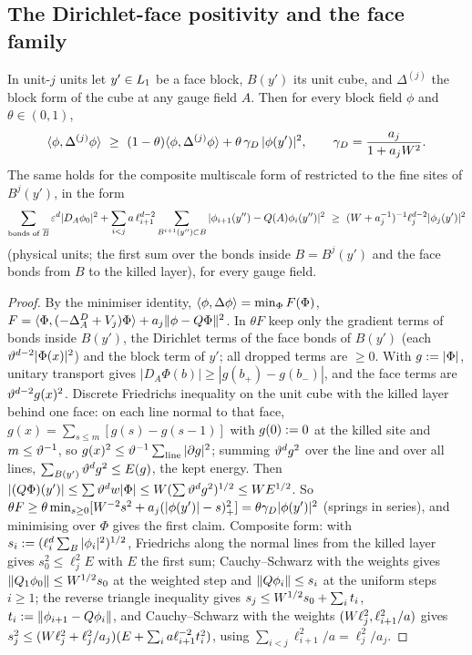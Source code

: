 \subsection{The Dirichlet-face positivity and the face family}\label{app:a01:face}

\begin{lemma}\label{lem:a01:FPC}
In unit-$j$ units let $y'\in L_{1}$ be a face block, $B(y')$ its unit cube, and $\Delta^{(j)}$ the block form of the cube at any gauge field $A$. Then for every block field $\phi$ and $\theta\in(0,1)$,
\[
\ip\phi{\Delta^{(j)}\phi}\ \ge\ (1-\theta)\ip\phi{\Delta^{(j)}\phi}+\theta\,\gamma_D\,|\phi(y')|^2,\qquad\gamma_D=\frac{a_j}{1+a_j\Wt^2}.
\]
The same holds for the composite multiscale form of \cite[(3.23)--(3.25)]{Ba2} restricted to the fine sites of $B^j(y')$, in the form
\[
\sum_{\text{bonds of }\overline{B}}\eps^{d}|D_A\phi_0|^2+\sum_{i<j}a\,\ell_{i+1}^{d-2}\sum_{B^{i+1}(y'')\subset B}|\phi_{i+1}(y'')-Q(A)\phi_i(y'')|^2\ \ge\ (\Wt+a_j^{-1})^{-1}\ell_j^{d-2}|\phi_j(y')|^2
\]
(physical units; the first sum over the bonds inside $B=B^j(y')$ and the face bonds from $B$ to the killed layer), for every gauge field.
\end{lemma}
\begin{proof}
By the minimiser identity, $\langle \phi,\Delta\phi\rangle=\min_\Phi F(\Phi)$, $F=\langle \Phi,(-\Delta^D_A+V_j)\Phi\rangle+a_j\lVert \phi-Q\Phi\rVert^2$. In $\theta F$ keep only the gradient terms of bonds inside $B(y')$, the Dirichlet terms of the face bonds of $B(y')$ (each $\vartheta^{d-2}|\Phi(x)|^2$) and the block term of $y'$; all dropped terms are $\ge0$. With $g:=|\Phi|$, unitary transport gives $|D_A\Phi(b)|\ge|g(b_+)-g(b_-)|$, and the face terms are $\vartheta^{d-2}g(x)^2$. Discrete Friedrichs inequality on the unit cube with the killed layer behind one face: on each line normal to that face, $g(x)=\sum_{s\le m}[g(s)-g(s-1)]$ with $g(0):=0$ at the killed site and $m\le\vartheta^{-1}$, so $g(x)^2\le\vartheta^{-1}\sum_{\text{line}}|\partial g|^2$; summing $\vartheta^dg^2$ over the line and over all lines, $\sum_{B(y')}\vartheta^dg^2\le E(g)$, the kept energy. Then $|(Q\Phi)(y')|\le\sum\vartheta^dw|\Phi|\le W(\sum\vartheta^dg^2)^{1/2}\le W E^{1/2}$. So $\theta F\ge\theta\min_{s\ge0}[W^{-2}s^2+a_j(|\phi(y')|-s)_+^2]=\theta\gamma_D|\phi(y')|^2$ (springs in series), and minimising over $\Phi$ gives the first claim. Composite form: with $s_i:=(\ell_i^d\sum_B|\phi_i|^2)^{1/2}$, Friedrichs along the normal lines from the killed layer gives $s_0^2\le\ell_j^2E$ with $E$ the first sum; Cauchy--Schwarz with the weights gives $\lVert Q_1\phi_0\rVert\le W^{1/2}s_0$ at the weighted step and $\lVert Q\phi_i\rVert\le s_i$ at the uniform steps $i\ge1$; the reverse triangle inequality gives $s_j\le W^{1/2}s_0+\sum_it_i$, $t_i:=\lVert \phi_{i+1}-Q\phi_i\rVert$, and Cauchy--Schwarz with the weights $(W\ell_j^2,\ell_{i+1}^2/a)$ gives $s_j^2\le(W\ell_j^2+\ell_j^2/a_j)(E+\sum_ia\ell_{i+1}^{-2}t_i^2)$, using $\sum_{i<j}\ell_{i+1}^2/a=\ell_j^2/a_j$.
\end{proof}

